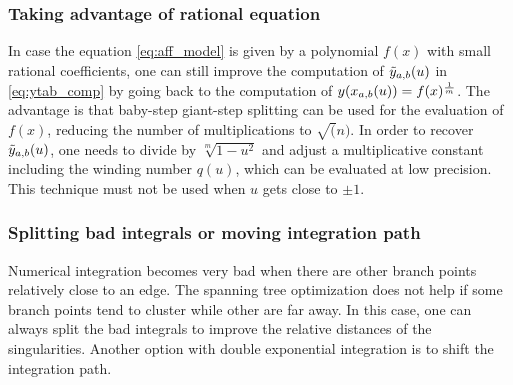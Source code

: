 \documentclass[main.tex]{subfiles}
\begin{document}
    \subsubsection{Taking advantage of rational equation}

    In case the equation \eqref{eq:aff_model} is given by a polynomial $f(x)$
    with small rational coefficients, one can still improve the computation
    of $\tilde{y}_{a,b}(u)$ in \eqref{eq:ytab_comp} by going back to
    the computation of $y(x_{a,b}(u))=f(x)^{\frac1m}$.
    The advantage is that baby-step giant-step splitting can be used for
    the evaluation of $f(x)$, reducing the number of multiplications to
    $\sqrt(n)$. In order to recover $\tilde{y}_{a,b}(u)$, one needs to divide by
    $\sqrt[m]{1-u^2}$ and adjust a multiplicative constant including
    the winding number $q(u)$, which can be evaluated at low precision.
    This technique must not be used when $u$ gets close to $\pm1$.

    \subsubsection{Splitting bad integrals or moving integration path}

    Numerical integration becomes very bad when there are other branch points
    relatively close to an edge. The spanning tree optimization does not help
    if some branch points tend to cluster while other are far away.
    In this case, one can always split the bad integrals to improve the
    relative distances of the singularities. Another option with
    double exponential integration is to shift the integration path.

\biblio
\end{document}
